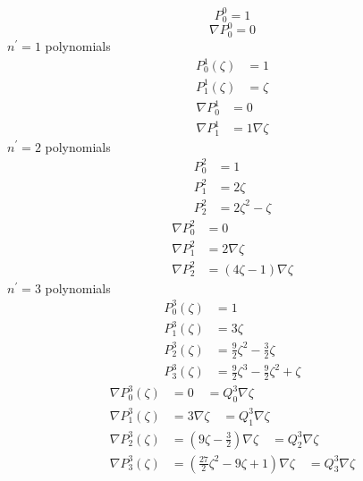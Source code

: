 \documentclass[a4paper,onecolumn]{article}
\begin{document}
$$
    P_0^0=1
$$
$$
    \nabla P_0^0=0
$$
\noindent $n^\prime = 1$ polynomials
\begin{equation*}\begin{split}
    P_0^1(\zeta) &=1\\
    P_1^1(\zeta) &=\zeta
\end{split}\end{equation*}
\begin{equation*}\begin{split}
    \nabla P_0^1 &= 0\\
    \nabla P_1^1 &= 1\nabla \zeta
\end{split}\end{equation*}
\noindent $n^\prime=2$ polynomials
\begin{equation*}\begin{split}
    P_0^2 &=1\\
    P_1^2 &= 2\zeta\\
    P_2^2 &= 2\zeta^2-\zeta
\end{split}\end{equation*}
\begin{equation*}\begin{split}
    \nabla P_0^2 &= 0\\
    \nabla P_1^2 &=2\nabla\zeta\\
    \nabla P_2^2 &= (4\zeta-1)\nabla\zeta
\end{split}\end{equation*}
\noindent $n^\prime=3$ polynomials
\begin{equation*}\begin{split}
    P_0^3(\zeta) &= 1\\
    P_1^3(\zeta) &=3\zeta\\
    P_2^3(\zeta) &=\frac{9}{2}\zeta^2 - \frac{3}{2}\zeta\\
    P_3^3(\zeta) &=\frac{9}{2}\zeta^3-\frac{9}{2}\zeta^2 +\zeta
\end{split}\end{equation*}
\begin{equation*}\begin{split}
    \nabla P_0^3(\zeta) &= 0 \quad=Q_0^3 \nabla\zeta\\
    \nabla P_1^3(\zeta) &=3\nabla\zeta \quad= Q_1^3 \nabla \zeta\\
    \nabla P_2^3(\zeta) &=\left(9\zeta-\frac{3}{2}\right)\nabla \zeta \quad= Q_2^3 \nabla\zeta\\
    \nabla P_3^3(\zeta) &=\left(\frac{27}{2}\zeta^2-9\zeta+1\right)\nabla \zeta\quad=Q_3^3\nabla \zeta
\end{split}\end{equation*}
\end{document}
